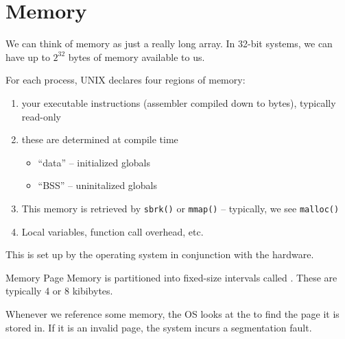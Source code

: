 \documentclass[code]{amznotes}
\begin{document}


\chapter{Memory}
We can think of memory as just a really long array. In 32-bit systems, we can have up to $2^{32}$ bytes of memory available to us.

For each process, UNIX declares four regions of memory:
\begin{enumerate}[noitemsep]
    \item {} your executable instructions (assembler compiled down to bytes), typically read-only
    \item {} these are determined at compile time
    \begin{itemize}[noitemsep]
        \item ``data'' -- initialized globals
        \item ``BSS'' -- uninitalized globals
    \end{itemize}
    \item {} This memory is retrieved by \texttt{sbrk()} or \texttt{mmap()} -- typically, we see \texttt{malloc()}
    \item {} Local variables, function call overhead, etc. 
\end{enumerate}
This is set up by the operating system in conjunction with the hardware.

\begin{dfnbox}{Memory Page}{}
Memory is partitioned into fixed-size intervals called . These are typically 4 or 8 kibibytes.
\end{dfnbox}

Whenever we reference some memory, the OS looks at the  to find the page it is stored in. If it is an invalid page, the system incurs a segmentation fault.
\end{document}
